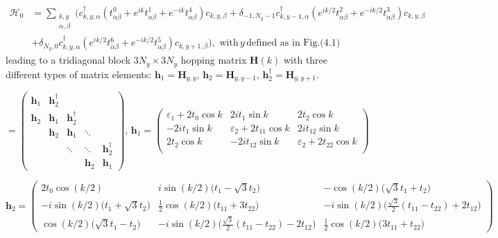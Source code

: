 \begin{equation}
\begin{split}
\mathcal{H}_0 &= \sum_{ \substack{k, y \\ \alpha, \beta} } \bigg( c_{k, y, \alpha}^\dagger (t_{\alpha \beta}^0  + e^{ik} t_{\alpha \beta}^1 + e^{-ik} t_{\alpha \beta}^4 )  c_{k, y, \beta} + \delta_{-1, N_y -1} c_{k, y - 1, \alpha}^\dagger ( e^{ik/2} t_{\alpha \beta}^2 + e^{-ik/2} t_{\alpha \beta}^3 ) c_{k, y, \beta} \\
& + \delta_{N_y, 0} c_{k, y, \alpha}^\dagger ( e^{ik/2} t_{\alpha \beta}^6 + e^{-ik/2} t_{\alpha \beta}^5 ) c_{k, y+1, \beta} \bigg) , \,\, \text{with} \, y \, \text{defined as in Fig.(4.1)}
\end{split}
\end{equation}
leading to a tridiagonal block $3 N_y \times 3 N_y$ hopping matrix $\bm H (k)$ with three different types of matrix elements: $\bm h_1 = \bm H_{y,y}$, $\bm h_2 = \bm H_{y,y-1}$, $\bm h_2^\dagger = \bm H_{y, y+1}$.

\begin{equation}
[ H_{(\alpha y) (\beta y')} (k) ] = 
\begin{pmatrix}
\bm h_1 & \bm h_2^\dagger & & & \\
\bm h_2 & \bm h_1 & \bm h_2^\dagger & & \\
& \bm h_2 & \bm h_1 & \ddots & \\
& & \ddots & \ddots & \bm h_2^\dagger \\
& & & \bm h_2 & \bm h_1
\end{pmatrix}, \, 
\bm h_1 = 
\begin{pmatrix}
\varepsilon_1 + 2 t_0 \cos k & 2 i t_1 \sin k & 2 t_2 \cos k \\
-2 i t_1 \sin k & \varepsilon_2 + 2 t_{11} \cos k & 2 i t_{12} \sin k \\
2 t_2 \cos k& -2 i t_{12} \sin k & \varepsilon_2 + 2 t_{22} \cos k \\
\end{pmatrix}
\end{equation}

\begin{equation*}
\bm h_2 =
\begin{pmatrix}
2 t_0 \cos ( k / 2 ) & i \sin ( k / 2 ) \bigg( t_1 - \sqrt{3} t_2 \bigg) & - \cos (k /2 ) \bigg( \sqrt{3} t_1 + t_2 \bigg) \\
-i \sin ( k / 2 ) \bigg(t_1 + \sqrt{3} t_2 \bigg) & \frac{1}{2} \cos (k / 2) \bigg( t_{11} + 3 t_{22} \bigg) & -i \sin (k / 2) \bigg( \frac{\sqrt{3}}{2} (t_{11} -  t_{22} ) + 2 t_{12} \bigg) \\
\cos ( k / 2) \bigg( \sqrt{3} t_1 - t_2 \bigg) & -i \sin (k / 2) \bigg( \frac{\sqrt{3}}{2} ( t_{11} - t_{22} ) - 2 t_{12} \bigg) & \frac{1}{2} \cos (k / 2) \bigg( 3 t_{11	} + t_{22} \bigg)
\end{pmatrix}
\end{equation*}

